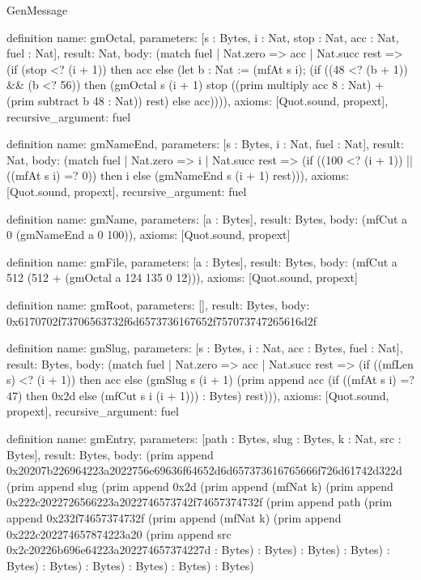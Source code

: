 \begin{lexlean}{GenMessage}
\begin{semanticmodule}
definition{
  name: gmOctal,
  parameters: [s : Bytes, i : Nat, stop : Nat, acc : Nat, fuel : Nat],
  result: Nat,
  body: (match fuel
    | Nat.zero => acc
    | Nat.succ rest => (if (stop <? (i + 1)) then acc else (let b : Nat := (mfAt s i); (if ((48 <? (b + 1)) && (b <? 56)) then (gmOctal s (i + 1) stop ((prim multiply acc 8 : Nat) + (prim subtract b 48 : Nat)) rest) else acc)))),
  axioms: [Quot.sound, propext],
  recursive_argument: fuel
}

definition{
  name: gmNameEnd,
  parameters: [s : Bytes, i : Nat, fuel : Nat],
  result: Nat,
  body: (match fuel
    | Nat.zero => i
    | Nat.succ rest => (if ((100 <? (i + 1)) || ((mfAt s i) =? 0)) then i else (gmNameEnd s (i + 1) rest))),
  axioms: [Quot.sound, propext],
  recursive_argument: fuel
}

definition{
  name: gmName,
  parameters: [a : Bytes],
  result: Bytes,
  body: (mfCut a 0 (gmNameEnd a 0 100)),
  axioms: [Quot.sound, propext]
}

definition{
  name: gmFile,
  parameters: [a : Bytes],
  result: Bytes,
  body: (mfCut a 512 (512 + (gmOctal a 124 135 0 12))),
  axioms: [Quot.sound, propext]
}

definition{
  name: gmRoot,
  parameters: [],
  result: Bytes,
  body: 0x6170702f73706563732f6d6573736167652f757073747265616d2f
}

definition{
  name: gmSlug,
  parameters: [s : Bytes, i : Nat, acc : Bytes, fuel : Nat],
  result: Bytes,
  body: (match fuel
    | Nat.zero => acc
    | Nat.succ rest => (if ((mfLen s) <? (i + 1)) then acc else (gmSlug s (i + 1) (prim append acc (if ((mfAt s i) =? 47) then 0x2d else (mfCut s i (i + 1))) : Bytes) rest))),
  axioms: [Quot.sound, propext],
  recursive_argument: fuel
}

definition{
  name: gmEntry,
  parameters: [path : Bytes, slug : Bytes, k : Nat, src : Bytes],
  result: Bytes,
  body: (prim append 0x20207b226964223a2022756e69636f64652d6d657373616765666f726d61742d322d (prim append slug (prim append 0x2d (prim append (mfNat k) (prim append 0x222c2022726566223a2022746573742f74657374732f (prim append path (prim append 0x232f74657374732f (prim append (mfNat k) (prim append 0x222c202274657874223a20 (prim append src 0x2c20226b696e64223a202274657374227d : Bytes) : Bytes) : Bytes) : Bytes) : Bytes) : Bytes) : Bytes) : Bytes) : Bytes) : Bytes)
}


\end{semanticmodule}
\end{lexlean}
